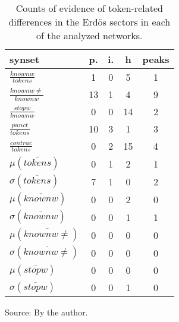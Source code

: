 \begin{table}[h!]
\begin{center}
\caption{Counts of evidence of token-related differences in the Erd\"os sectors in each of the analyzed networks.}
	\def\arraystretch{1.5}
\begin{tabular}{| l || c | c | c || c |}\hline
{\bf synset} & {\bf p.} & {\bf i.} & {\bf h} & {\bf peaks} \\\hline\hline
$\frac{knownw}{tokens}$ & 1  & 0  & 5  & 1 \\
$\frac{knownw \neq}{knownw}$ & 13  & 1  & 4  & 9 \\
$\frac{stopw}{knownw}$ & 0  & 0  & 14  & 2 \\
$\frac{punct}{tokens}$ & 10  & 3  & 1  & 3 \\
$\frac{contrac}{tokens}$ & 0  & 2  & 15  & 4 \\\hline
$\mu(\overline{tokens})$ & 0  & 1  & 2  & 1 \\
$\sigma(\overline{tokens})$ & 7  & 1  & 0  & 2 \\\hline
$\mu(\overline{knownw})$ & 0  & 0  & 2  & 0 \\
$\sigma(\overline{knownw})$ & 0  & 0  & 1  & 1 \\\hline
$\mu(\overline{knownw \neq})$ & 0  & 0  & 0  & 0 \\
$\sigma(\overline{knownw \neq})$ & 0  & 0  & 0  & 0 \\\hline
$\mu(\overline{stopw})$ & 0  & 0  & 0  & 0 \\
$\sigma(\overline{stopw})$ & 0  & 0  & 1  & 0 \\\hline
\end{tabular}
\begin{flushleft}\footnotesize
		Source: By the author.\
\end{flushleft}
\end{center}
\end{table}
